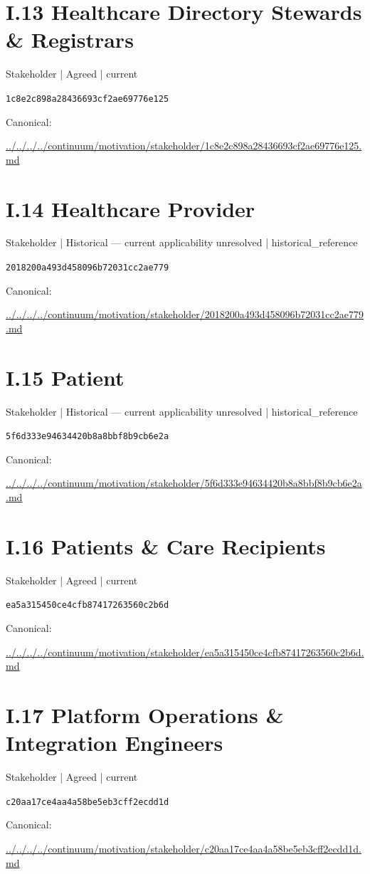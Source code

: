 \documentclass[10pt,a4paper]{article}
\begin{document}
\section*{I.13 Healthcare Directory Stewards \& Registrars}
{\small Stakeholder | Agreed | current}\par
\texttt{1c8e2c898a28436693cf2ae69776e125}\par
Canonical: \par
{\footnotesize\url{../../../../continuum/motivation/stakeholder/1c8e2c898a28436693cf2ae69776e125.md}}\par
\section*{I.14 Healthcare Provider}
{\small Stakeholder | Historical — current applicability unresolved | historical\_reference}\par
\texttt{2018200a493d458096b72031cc2ae779}\par
Canonical: \par
{\footnotesize\url{../../../../continuum/motivation/stakeholder/2018200a493d458096b72031cc2ae779.md}}\par
\section*{I.15 Patient}
{\small Stakeholder | Historical — current applicability unresolved | historical\_reference}\par
\texttt{5f6d333e94634420b8a8bbf8b9cb6e2a}\par
Canonical: \par
{\footnotesize\url{../../../../continuum/motivation/stakeholder/5f6d333e94634420b8a8bbf8b9cb6e2a.md}}\par
\section*{I.16 Patients \& Care Recipients}
{\small Stakeholder | Agreed | current}\par
\texttt{ea5a315450ce4cfb87417263560c2b6d}\par
Canonical: \par
{\footnotesize\url{../../../../continuum/motivation/stakeholder/ea5a315450ce4cfb87417263560c2b6d.md}}\par
\section*{I.17 Platform Operations \& Integration Engineers}
{\small Stakeholder | Agreed | current}\par
\texttt{c20aa17ce4aa4a58be5eb3cff2ecdd1d}\par
Canonical: \par
{\footnotesize\url{../../../../continuum/motivation/stakeholder/c20aa17ce4aa4a58be5eb3cff2ecdd1d.md}}\par
\end{document}

